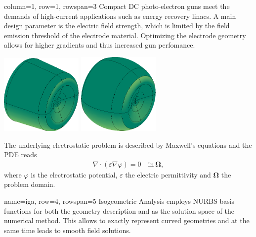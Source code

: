 \documentclass[
   accentcolor=9b,
   boxstyle=boxed
   ]{tudasciposter}
\begin{document}
\begin{tcbposter}[poster={columns=2, rows=8, spacing=1cm}]

\begin{posterboxenv}[title=Motivation]{column=1, row=1, rowspan=3}
   Compact DC photo-electron guns meet the demands of high-current applications such as energy recovery linacs. A main design parameter is the electric field strength, which is limited by the field emission threshold of the electrode material. Optimizing the electrode geometry allows for higher gradients and thus increased gun perfomance.
   \begin{center}
      \includegraphics[width=0.3\textwidth]{fig/electrode_init.png}
      \qquad
      \includegraphics[width=0.3\textwidth]{fig/electrode_opt.png}
   \end{center}
   The underlying electrostatic problem is described by Maxwell's equations and the PDE reads
   \begin{align*}
      \nabla \cdot (\varepsilon \nabla \varphi) = 0 \quad \mathrm{in}\ \boldsymbol{\Omega},
   \end{align*}
   where $\varphi$ is the electrostatic potential, $\varepsilon$ the electric permittivity and $\boldsymbol{\Omega}$ the problem domain.
\end{posterboxenv}

\begin{posterboxenv}[title=Isogeometric Analysis]{name=iga, row=4, rowspan=5}
   Isogeometric Analysis employs NURBS basis functions for both the geometry description and as the solution space of the numerical method. This allows to exactly represent curved geometries and at the same time leads to smooth field solutions.\\


\end{posterboxenv}
\end{tcbposter}
\end{document}
